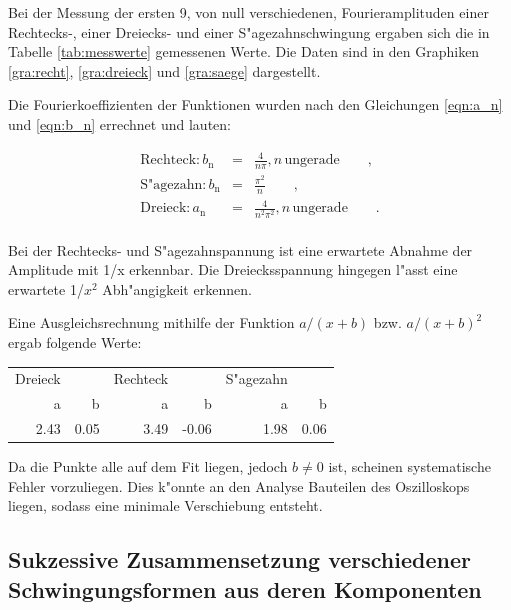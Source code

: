 \clearpage




Bei der Messung der ersten 9, von null verschiedenen, Fourieramplituden einer Rechtecks-, einer Dreiecks- und einer S"agezahnschwingung ergaben sich die in Tabelle \ref{tab:messwerte} gemessenen Werte. Die Daten sind in den Graphiken \ref{gra:recht}, \ref{gra:dreieck} und \ref{gra:saege} dargestellt.

Die Fourierkoeffizienten der Funktionen wurden nach den Gleichungen \eqref{eqn:a_n} und \eqref{eqn:b_n} errechnet und lauten:

\begin{eqnarray*}
\text{Rechteck}: b_\mathrm{n} &=& \frac{4}{n \pi}, n \, \text{ungerade} \qquad ,\\
\text{S"agezahn}: b_\mathrm{n} &=& \frac{\pi^2}{n}  \qquad ,\\
\text{Dreieck}: a_\mathrm{n} &=& \frac{4}{n^2 \pi^2}, n \,\text{ungerade} \qquad .\\
\end{eqnarray*}

Bei der Rechtecks- und S"agezahnspannung ist eine erwartete Abnahme der Amplitude mit 1/x erkennbar.
Die Dreiecksspannung hingegen l"asst eine erwartete 1/$x^2$ Abh"angigkeit erkennen.

Eine Ausgleichsrechnung mithilfe der Funktion $a/(x+b)$ bzw. $a/(x+b)^2$ ergab folgende Werte:

\begin{table}[!h]
\begin{center}
\begin{tabular}{|r|r|r|r|r|r|}
\hline
Dreieck & & Rechteck & & S"agezahn &\\
a & b & a & b & a & b\\
\hline
\hline
2.43 & 0.05 & 3.49 & -0.06 & 1.98 & 0.06\\
\hline
\end{tabular}
\label{}
\end{center}
\end{table}

Da die Punkte alle auf dem Fit liegen, jedoch $b \neq 0$ ist, scheinen systematische Fehler vorzuliegen. Dies k"onnte an den Analyse Bauteilen des Oszilloskops liegen, sodass eine minimale Verschiebung entsteht.

\subsection{Sukzessive Zusammensetzung verschiedener Schwingungsformen aus deren Komponenten}
\label{sub:sukzessive_zusammensetzung_verschiedener_schwingungsformen_aus_deren_komponenten}

